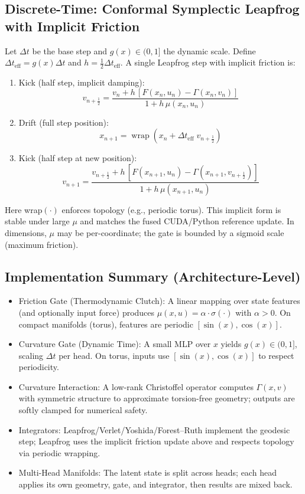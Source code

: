 \documentclass{article}
\numberwithin{equation}{section}
\begin{document}
\subsection{Discrete-Time: Conformal Symplectic Leapfrog with Implicit Friction}
Let $\Delta t$ be the base step and $g(x)\in(0,1]$ the dynamic scale. Define $\Delta t_{\text{eff}} = g(x)\Delta t$ and $h = \tfrac{1}{2}\Delta t_{\text{eff}}$. A single Leapfrog step with implicit friction is:
\begin{enumerate}
\item Kick (half step, implicit damping):
\[
v_{n+\tfrac{1}{2}} = \frac{v_n + h\,[F(x_n,u_n) - \Gamma(x_n,v_n)]}{1 + h\,\mu(x_n,u_n)}
\]
\item Drift (full step position):
\[
x_{n+1} = \operatorname{wrap}\!\left(x_n + \Delta t_{\text{eff}}\; v_{n+\tfrac{1}{2}}\right)
\]
\item Kick (half step at new position):
\[
v_{n+1} = \frac{v_{n+\tfrac{1}{2}} + h\,[F(x_{n+1},u_n) - \Gamma(x_{n+1},v_{n+\tfrac{1}{2}})]}{1 + h\,\mu(x_{n+1},u_n)}
\]
\end{enumerate}
Here wrap$(\cdot)$ enforces topology (e.g., periodic torus). This implicit form is stable under large $\mu$ and matches the fused CUDA/Python reference update. In dimensions, $\mu$ may be per-coordinate; the gate is bounded by a sigmoid scale (maximum friction).

\subsection{Implementation Summary (Architecture-Level)}
\begin{itemize}
\item Friction Gate (Thermodynamic Clutch): A linear mapping over state features (and optionally input force) produces $\mu(x,u)=\alpha\cdot\sigma(\cdot)$ with $\alpha>0$. On compact manifolds (torus), features are periodic $[\sin(x), \cos(x)]$.
\item Curvature Gate (Dynamic Time): A small MLP over $x$ yields $g(x)\in(0,1]$, scaling $\Delta t$ per head. On torus, inputs use $[\sin(x), \cos(x)]$ to respect periodicity.
\item Curvature Interaction: A low-rank Christoffel operator computes $\Gamma(x,v)$ with symmetric structure to approximate torsion-free geometry; outputs are softly clamped for numerical safety.
\item Integrators: Leapfrog/Verlet/Yoshida/Forest–Ruth implement the geodesic step; Leapfrog uses the implicit friction update above and respects topology via periodic wrapping.
\item Multi-Head Manifolds: The latent state is split across heads; each head applies its own geometry, gate, and integrator, then results are mixed back.
\end{itemize}
\end{document}
